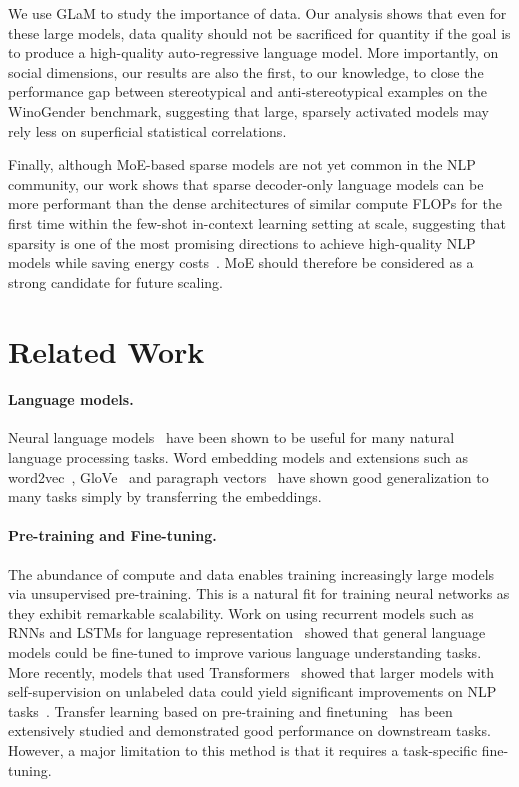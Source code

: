 \documentclass{article}
\begin{document}
We use GLaM to study the importance of data. Our analysis shows that even for these large models, data quality should not be sacrificed for quantity if the goal is to produce a high-quality auto-regressive language model. More importantly, on social dimensions, our results are also the first, to our knowledge, to close the performance gap between stereotypical and anti-stereotypical examples on the WinoGender benchmark, suggesting that large, sparsely activated models may rely less on superficial statistical correlations.

Finally, although MoE-based sparse models are not yet common in the NLP community, our work shows that sparse decoder-only language models can be more performant than the dense architectures of similar compute FLOPs for the first time within the few-shot in-context learning setting at scale, suggesting 
that sparsity is one of the most promising directions to achieve high-quality NLP models while saving energy costs~\cite{patterson2021carbon}. MoE should therefore be considered as a strong candidate for future scaling. 

\section{Related Work}
\label{sec:related}

\paragraph{Language models.} Neural language models~\cite{Mikolov2010rnnlm,sutskever2011_rnnlm} have been shown to be useful for many natural language processing tasks.
Word embedding models and extensions such as word2vec~\cite{mikolov2013efficient}, GloVe~\cite{pennington-glove} and paragraph vectors~\cite{le2014distributed}
have shown good generalization to many tasks simply by transferring the embeddings. 

\paragraph{Pre-training and Fine-tuning.} The abundance of compute and data enables training increasingly large models via unsupervised pre-training. This is a natural fit for training neural networks as they exhibit remarkable scalability. Work on using recurrent models such as RNNs and LSTMs for language representation~\cite{NIPS2015_dai,kiros-skip-thought} showed that general language models could be fine-tuned to improve various language understanding tasks. More recently, models that used Transformers~\cite{vaswani2017attention} showed that larger models with self-supervision on unlabeled data could yield significant improvements on NLP tasks~\cite{devlin2018bert,yang2019xlnet,liu2019roberta,clark2020electra}. Transfer learning based on pre-training and finetuning~\cite{raffel2020exploring,houlsby2019parameterefficient} has been extensively studied and  demonstrated good performance on downstream tasks. However, a major limitation to this method is that it requires a task-specific fine-tuning. 
\end{document}
